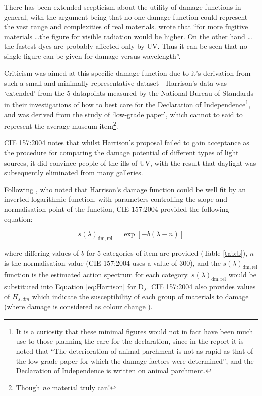 There has been extended scepticism about the utility of damage functions in general, with the argument being that no one damage function could represent the vast range and complexities of real materials. \citet[p. 178]{thomson_museum_1978} wrote that ``for more fugitive materials \dots the figure for visible radiation would be higher. On the other hand \dots the fastest dyes are probably affected only by UV. Thus it can be seen that no single figure can be given for damage versus wavelength''.

Criticism was aimed at this specific damage function due to it's derivation from such a small and minimally representative dataset - Harrison's data was `extended' from the 5 datapoints measured by the National Bureau of Standards \citep{national_bureau_of_standards_preservation_1951} in their investigations of how to best care for the Declaration of Independence\footnote{It is a curiosity that these minimal figures would not in fact have been much use to those planning the care for the declaration, since in the report it is noted that ``The deterioration of animal parchment is not as rapid as that of the low-grade paper for which the damage factors were determined''\citep{national_bureau_of_standards_preservation_1951}, and the Declaration of Independence is written on animal parchment.}, and was derived from the study of `low-grade paper', which cannot to said to represent the average museum item\footnote{Though \emph{no} material truly can!}.

CIE 157:2004 \citep{cie_cie_2004} notes that whilst Harrison's proposal failed to gain acceptance as the procedure for comparing the damage potential of different types of light sources, it did convince people of the ills of \gls{UV}, with the result that daylight was subsequently eliminated from many galleries.

Following \citet{cuttle_lighting_1988}, who noted that Harrison's damage function could be well fit by an inverted logarithmic function, with parameters controlling the slope and normalisation point of the function, CIE 157:2004 provided the following equation:

\begin{equation}
    s(\lambda)_{\mathrm{dm,rel}}=\exp [-b(\lambda-n)]
    \label{eq:damfac}
\end{equation}

where differing values of $b$ for 5 categories of item are provided (Table \ref{tab:b}), $n$ is the normalisation value (CIE 157:2004 uses a value of 300), and the $s(\lambda)_{\mathrm{dm,rel}}$ function is the estimated action spectrum for each category. $s(\lambda)_{\mathrm{dm,rel}}$ would be substituted into Equation \ref{eq:Harrison} for $\mathrm{D}_{\lambda}$. CIE 157:2004 also provides values of $H_{s,dm}$ which indicate the susceptibility of each group of materials to damage (where damage is considered as colour change%
).

